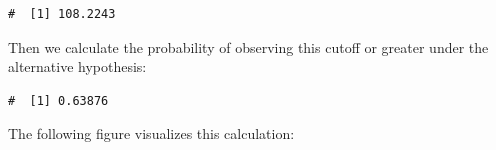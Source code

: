 \documentclass[letterpaper,11pt,twoside,]{pinp}
\begin{document}
\begin{ShadedResult}
\begin{verbatim}
#  [1] 108.2243
\end{verbatim}
\end{ShadedResult}

Then we calculate the probability of observing this cutoff or greater
under the alternative hypothesis:

\begin{Shaded}
\begin{Highlighting}[]
\NormalTok{(} \NormalTok{, }  \SpecialCharTok{/} \NormalTok{(}\NormalTok{), } \NormalTok{)}
\end{Highlighting}
\end{Shaded}

\begin{ShadedResult}
\begin{verbatim}
#  [1] 0.63876
\end{verbatim}
\end{ShadedResult}

The following figure visualizes this calculation:

\begin{Shaded}
\begin{Highlighting}[]
\NormalTok{(}\NormalTok{)}
\NormalTok{(} \NormalTok{, } \NormalTok{, } \NormalTok{, } \NormalTok{,}
            \NormalTok{(} \NormalTok{, } \NormalTok{, }  \SpecialCharTok{/} \NormalTok{(}\NormalTok{)),}
            \NormalTok{, } \NormalTok{)}
\end{Highlighting}
\end{Shaded}
\end{document}
